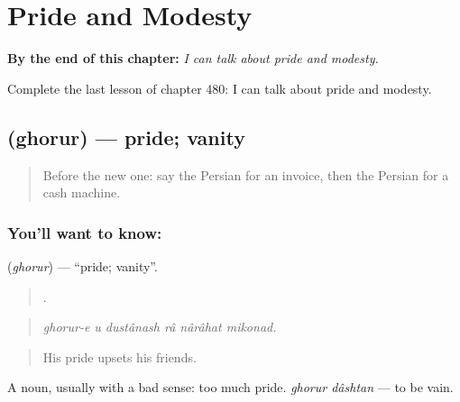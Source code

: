 
\chapter{Pride and Modesty}
\label{ch:fa-pride-and-modesty}

\begin{chapteropening}
\textbf{By the end of this chapter:} \emph{I can talk about pride and modesty.}

Complete the last lesson of chapter 480: I can talk about pride and modesty.
\end{chapteropening}

\section[\texorpdfstring{\fa{غرور} (ghorur)}{غرور (ghorur)}]{ (ghorur) — pride; vanity}

\label{lesson:FA-C480-ghorur}



\begin{quote}
Before the new one: say the Persian for an invoice, then the Persian for a cash machine.
\end{quote}

\subsection*{You'll want to know: }
\textbf{} (\emph{ghorur}) — \textquotedblleft{}pride; vanity\textquotedblright{}.

\begin{quote}
     .
\end{quote}

\begin{quote}
\emph{ghorur-e u dustânash râ nârâhat mikonad.}
\end{quote}

\begin{quote}
His pride upsets his friends.
\end{quote}

A noun, usually with a bad sense: too much pride. \emph{ghorur dâshtan} — to be vain.


